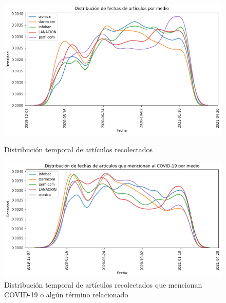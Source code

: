 \begin{figure}
    \centering
    \includegraphics[width=\textwidth]{img/fechas_por_medios_todas.png}
    \caption{Distribución temporal de artículos recolectados}
    \label{fig:fecha_articulos_por_medio_todas}
    \includegraphics[width=\textwidth]{img/fechas_por_medios.png}
    \caption{Distribución temporal de artículos recolectados que mencionan COVID-19 o algún término relacionado}
    \label{fig:fecha_articulos_por_medio_covid}
\end{figure}

